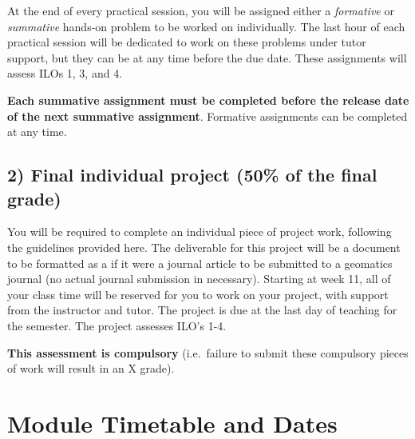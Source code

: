 \documentclass[
]{book}
\let\BeginKnitrBlock\begin \let\EndKnitrBlock\end
\begin{document}
At the end of every practical session, you will be assigned either a \emph{formative} or \emph{summative} hands-on problem to be worked on individually. The last hour of each practical session will be dedicated to work on these problems under tutor support, but they can be at any time before the due date. These assignments will assess ILOs 1, 3, and 4.

\BeginKnitrBlock{rmdimportant}
\textbf{Each summative assignment must be completed before the release date of the next summative
assignment}. Formative assignments can be completed at any time.
\EndKnitrBlock{rmdimportant}

\hypertarget{final-individual-project-50-of-the-final-grade}{%
\subsection*{2) Final individual project (50\% of the final grade)}\label{final-individual-project-50-of-the-final-grade}}

You will be required to complete an individual piece of project work, following the guidelines provided here. The deliverable for this project will be a document to be formatted as a if it were a journal article to be submitted to a geomatics journal (no actual journal submission in necessary). Starting at week 11, all of your class time will be reserved for you to work on your project, with support from the instructor and tutor. The project is due at the last day of teaching for the semester. The project assesses ILO's 1-4.

\BeginKnitrBlock{rmdimportant}
\textbf{This assessment is compulsory} (i.e.~failure to submit these compulsory pieces of work will
result in an X grade).
\EndKnitrBlock{rmdimportant}

\hypertarget{module-timetable-and-dates}{%
\section{Module Timetable and Dates}\label{module-timetable-and-dates}}
\end{document}
